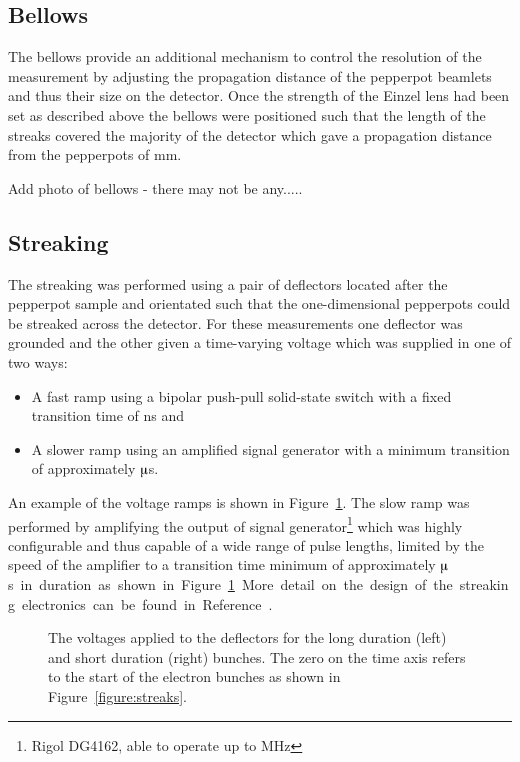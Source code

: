 \subsection{Bellows}

The bellows provide an additional mechanism to control the resolution of the measurement by adjusting the propagation distance of the pepperpot beamlets and thus their size on the detector.
Once the strength of the Einzel lens had been set as described above the bellows were positioned such that the length of the streaks covered the majority of the detector which gave a propagation distance from the pepperpots of \unit[475]{mm}.

{\color{red}Add photo of bellows - there may not be any.....}

\subsection{Streaking}
The streaking was performed using a pair of deflectors located after the pepperpot sample and orientated such that the one-dimensional pepperpots could be streaked across the detector.
For these measurements one deflector was grounded and the other given a time-varying voltage which was supplied in one of two ways:
\begin{itemize}
\item A fast ramp using a bipolar push-pull solid-state switch with a fixed transition time of \unit[10]{ns} and
\item A slower ramp using an amplified signal generator with a minimum transition of approximately \unit[10]{$\muup$s}.
\end{itemize}
An example of the voltage ramps is shown in Figure~\ref{figure:deflector_voltages}. The slow ramp was performed by amplifying the output of signal generator\footnote{Rigol DG4162, able to operate up to \unit[160]{MHz}} which was highly configurable and thus capable of a wide range of pulse lengths, limited by the speed of the amplifier to a transition time minimum of approximately \unit[10]{$\muup$s} in duration as shown in Figure~\ref{figure:deflector_voltages}.
More detail on the design of the streaking electronics can be found in Reference~\cite{speirs_electron_2017}.

\begin{figure}
    \center
    
    \caption{The voltages applied to the deflectors for the long duration (left) and short duration (right) bunches. The zero on the time axis refers to the start of the electron bunches as shown in Figure~\ref{figure:streaks}.}
    \label{figure:deflector_voltages}
\end{figure}

